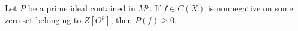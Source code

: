 Let $P$ be a prime ideal contained in $M^p$. If $f \in C(X)$ is nonnegative on some zero-set belonging to $Z[O^p]$, then $P(f) \geq 0$.
